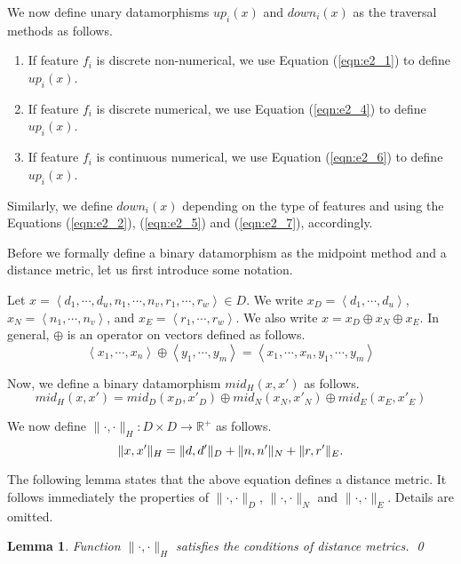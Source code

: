 \documentclass[preprint,1p,authoryear,times]{elsarticle}
\newtheorem{Lemma}{Lemma}
\begin{document}
We now define unary datamorphisms $up_i(x)$ and $down_i(x)$ as the traversal methods as follows. 
\begin{enumerate}
\item If feature $f_i$ is discrete non-numerical, we use Equation (\ref{eqn:e2_1}) to define $up_i(x)$. 
\item If feature $f_i$ is discrete numerical, we use Equation (\ref{eqn:e2_4}) to define $up_i(x)$. 
\item If feature $f_i$ is continuous numerical, we use Equation (\ref{eqn:e2_6}) to define $up_i(x)$. 
\end{enumerate}

Similarly, we define $down_i(x)$ depending on the type of features and using the Equations (\ref{eqn:e2_2}), (\ref{eqn:e2_5}) and (\ref{eqn:e2_7}), accordingly. 

Before we formally define a binary datamorphism as the midpoint method and a distance metric, let us first introduce some notation. 

Let $x=\left<d_1, \cdots, d_u, n_1, \cdots, n_v, r_1, \cdots, r_w\right> \in D$. We write $x_D = \left<d_1,\cdots, d_u\right>$, $x_N =\left<n_1, \cdots, n_v\right>$, and $x_E=\left<r_1, \cdots, r_w\right>$. We also write $x = x_D \oplus x_N \oplus x_E$. In general, $\oplus$ is an operator on vectors defined as follows. 
\[\left<x_1, \cdots, x_n\right> \oplus \left<y_1, \cdots, y_m\right> = \left<x_1, \cdots, x_n, y_1, \cdots, y_m\right>\]
 
Now, we define a binary datamorphism $mid_H(x,x')$ as follows.
\begin{equation}
mid_H(x,x')=mid_D(x_D,x'_D) \oplus mid_N(x_N,x'_N) \oplus mid_E(x_E,x'_E)
\end{equation}

We now define $\|\cdot ,\cdot \|_H :D\times D \rightarrow \mathbb{R}^+$ as follows. 
\begin{equation}
\|x, x'\|_H= \|d, d'\|_D + \|n,n'\|_N + \|r,r'\|_E. \label{eqn:e2_10}\\
\end{equation}

The following lemma states that the above equation defines a distance metric. It follows immediately the properties of $\|\cdot,\cdot\|_D$, $\|\cdot,\cdot\|_N$ and $\|\cdot,\cdot\|_E$. Details are omitted.

\begin{Lemma}
Function $\|\cdot,\cdot \|_H$ satisfies the conditions of distance metrics. \qed
\end{Lemma}
\end{document}
